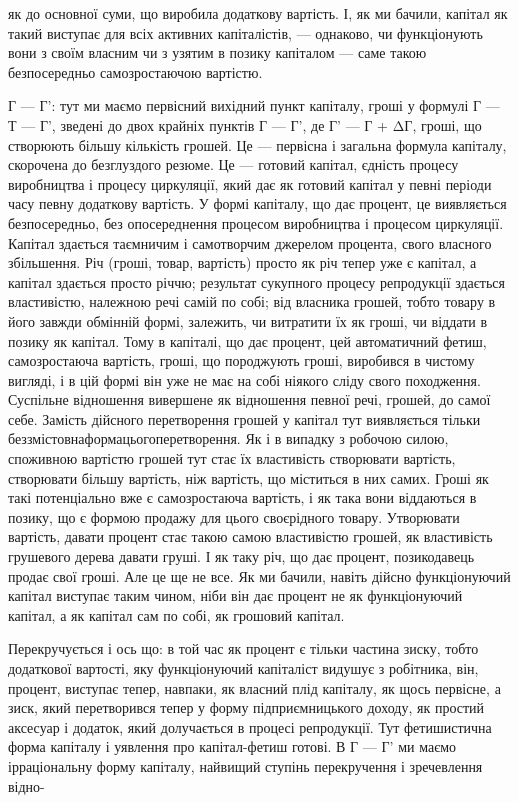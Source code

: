 як до основної суми, що виробила додаткову вартість. І, як ми
бачили, капітал як такий виступає для всіх активних капіталістів,
— однаково, чи функціонують вони з своїм власним чи
з узятим в позику капіталом — саме такою безпосередньо самозростаючою
вартістю.

Г — Г': тут ми маємо первісний вихідний пункт капіталу, гроші
у формулі Г — Т — Г', зведені до двох крайніх пунктів Г — Г', де
Г' — Г + ΔГ, гроші, що створюють більшу кількість грошей.
Це — первісна і загальна формула капіталу, скорочена до безглуздого
резюме. Це — готовий капітал, єдність процесу виробництва
і процесу циркуляції, який дає як готовий капітал у
певні періоди часу певну додаткову вартість. У формі капіталу,
що дає процент, це виявляється безпосередньо, без опосереднення
процесом виробництва і процесом циркуляції. Капітал
здається таємничим і самотворчим джерелом процента, свого
власного збільшення. Річ (гроші, товар, вартість) просто як річ
тепер уже є капітал, а капітал здається просто річчю; результат
сукупного процесу репродукції здається властивістю, належною
речі самій по собі; від власника грошей, тобто товару
в його завжди обмінній формі, залежить, чи витратити їх як гроші,
чи віддати в позику як капітал. Тому в капіталі, що дає процент,
цей автоматичний фетиш, самозростаюча вартість, гроші,
що породжують гроші, виробився в чистому вигляді, і в цій
формі він уже не має на собі ніякого сліду свого походження.
Суспільне відношення вивершене як відношення певної речі, грошей,
до самої себе. Замість дійсного перетворення грошей у капітал
тут виявляється тільки беззмістовнаформацьогоперетворення.
Як і в випадку з робочою силою, споживною вартістю грошей
тут стає їх властивість створювати вартість, створювати більшу
вартість, ніж вартість, що міститься в них самих. Гроші як такі
потенціально вже є самозростаюча вартість, і як така вони віддаються
в позику, що є формою продажу для цього своєрідного
товару. Утворювати вартість, давати процент стає такою
самою властивістю грошей, як властивість грушевого дерева
давати груші. І як таку річ, що дає процент, позикодавець
продає свої гроші. Але це ще не все. Як ми бачили, навіть
дійсно функціонуючий капітал виступає таким чином, ніби він
дає процент не як функціонуючий капітал, а як капітал сам по
собі, як грошовий капітал.

Перекручується і ось що: в той час як процент є тільки
частина зиску, тобто додаткової вартості, яку функціонуючий
капіталіст видушує з робітника, він, процент, виступає тепер,
навпаки, як власний плід капіталу, як щось первісне, а зиск,
який перетворився тепер у форму підприємницького доходу,
як простий аксесуар і додаток, який долучається в процесі репродукції.
Тут фетишистична форма капіталу і уявлення про
капітал-фетиш готові. В Г — Г' ми маємо ірраціональну форму
капіталу, найвищий ступінь перекручення і зречевлення відно-
